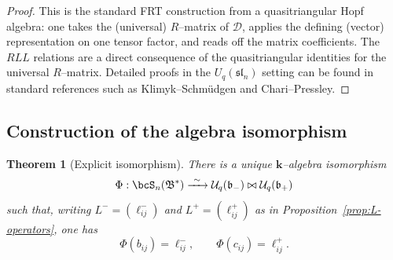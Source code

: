 \documentclass[11pt]{article}
\newtheorem{theorem}{Theorem}
\theoremstyle{definition}
\newcommand{\Bbbk}{\mathbf{k}}
\newcommand{\Uc}{\mathcal{U}}
\newcommand{\fsl}{\mathfrak{sl}}
\newcommand{\fb}{\mathfrak{b}}
\newcommand{\bipr}{\bowtie}
\begin{document}
\begin{proof}
This is the standard FRT construction from a quasitriangular Hopf algebra: one takes the (universal) $R$--matrix of $\mathcal{D}$, applies the defining (vector) representation on one tensor factor, and reads off the matrix coefficients. The $RLL$ relations are a direct consequence of the quasitriangular identities for the universal $R$--matrix. Detailed proofs in the $U_q(\fsl_n)$ setting can be found in standard references such as Klimyk--Schm\"udgen and Chari--Pressley.
\end{proof}

\subsection{Construction of the algebra isomorphism}

\begin{theorem}[Explicit isomorphism]\label{thm:main-iso}
There is a unique $\Bbbk$--algebra isomorphism
\[
\Phi:\bcS_n(\mathfrak B^*) \xrightarrow{\ \sim\ } \Uc_q(\fb_-)\bipr \Uc_q(\fb_+)
\]
such that, writing $L^-=(\ell^-_{ij})$ and $L^+=(\ell^+_{ij})$ as in Proposition~\ref{prop:L-operators}, one has
\[
\Phi(b_{ij})=\ell^-_{ij},
\qquad
\Phi(c_{ij})=\ell^+_{ij}.
\]
\end{theorem}
\end{document}
